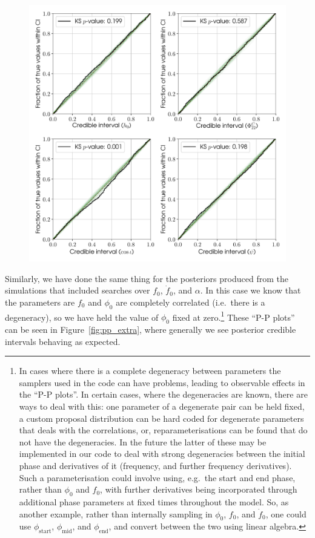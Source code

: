 \begin{figure}[!phtb]
\begin{center}
\includegraphics[width=1\columnwidth]{./figures/codeeval/stats/pp_standard/pp_plots_standard}
\caption{ \protect}
\end{center}
\end{figure}

Similarly, we have done the same thing for the posteriors produced from the simulations that included searches over $f_0$, $\dot{f}_0$, and $\alpha$. 
In this case we know that the parameters are $f_0$ and $\phi_0$ are completely correlated (i.e.\ there is a degeneracy), so we have held the value of $\phi_0$
fixed at zero.\footnote{In cases where there is a complete degeneracy between parameters the samplers used in the code can have problems, leading to observable effects in
the ``P-P plots''. In certain cases, where the degeneracies are known, there are ways to deal with this: one parameter of a degenerate pair can be held fixed,
a custom proposal distribution can be hard coded for degenerate parameters that deals with the correlations, or, reparameterisations can be found that do not
have the degeneracies. In the future the latter of these may be implemented in our code to deal with strong degeneracies between the initial phase and derivatives of it
(frequency, and further frequency derivatives). Such a parameterisation could involve using, e.g.\ the start and end phase, rather than $\phi_0$ and $f_0$,
with further derivatives being incorporated through additional phase parameters at fixed times throughout the model. So, as another example, rather than
internally sampling in $\phi_0$, $f_0$, and $\dot{f}_0$, one could use $\phi_{\text{start}}$, $\phi_{\text{mid}}$, and $\phi_{\text{end}}$, and convert between
the two using linear algebra.} These ``P-P plots'' can be seen in Figure~\ref{fig:pp_extra}, where generally we see posterior credible intervals behaving as
expected.

